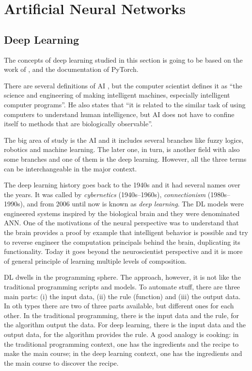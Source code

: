 \section{Artificial Neural Networks}\label{sec:ann}

\subsection{Deep Learning}\label{sec:deep_learning}

The concepts of deep learning studied in this section is going to be based on the work of \textcite{goodfellow2016}, \textcite{haykin1999} and the documentation of PyTorch.

There are several definitions of AI \cite{winston1992}, but the  computer scientist \textcite{mccarthy2007} defines it as ``the science and engineering of making intelligent machines, especially intelligent computer programs''.
He also states that ``it is related to the similar task of using computers to understand human intelligence, but AI does not have to confine itself to methods that are biologically observable''.

The big area of study is the AI and it includes several branches like fuzzy logics, robotics and machine learning.
The later one, in turn, is another field with also some branches and one of them is the deep learning.
However, all the three terms can be interchangeable in the major context.

The deep learning history goes back to the 1940s and it had several names over the years. 
It was called by \emph{cybernetics} (1940s--1960s), \emph{connectionism} (1980s--1990s), and from 2006 until now is known as \emph{deep learning}.
The DL models were engineered systems inspired by the biological brain and they were denominated ANN.
One of the motivations of the neural  perspective was to understand that the brain provides a proof by example that intelligent behavior is possible and try to reverse engineer the computation principals behind the brain, duplicating its functionality.
Today it goes beyond the neuroscientist perspective and it is more of general principle of learning multiple levels of composition.

DL dwells in the programming sphere. 
The approach, however, it is not like the traditional programming scripts and models. 
To automate stuff, there are three main parts: (i) the input data, (ii) the rule (function) and (iii) the output data. 
In oth types there are two of three parts available, but different ones for each other. 
In the traditional programming, there is the input data and the rule, for the algorithm output the data. 
For deep learning, there is the input data and the output data, for the algorithm provides the rule. 
A good analogy is cooking: in the traditional programming context, one has the ingredients and the recipe to make the main course; in the deep learning context, one has the ingredients and the main course to discover the recipe.

